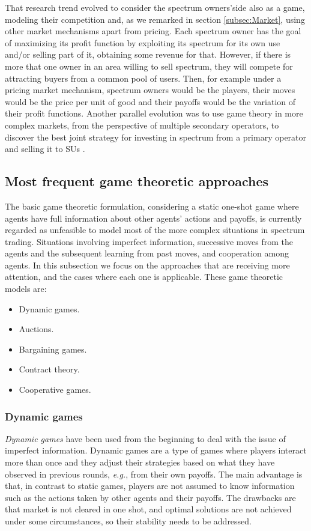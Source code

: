 That research trend evolved to consider the spectrum owners'side also as a game, modeling their competition \cite{ref:Xing2007,ref:Maille2009,ref:Shen2013} and, as we remarked in section \ref{subsec:Market}, using other market mechanisms apart from pricing. 
Each spectrum owner has the goal of maximizing its profit function by exploiting its spectrum for its own use and/or selling part of it, obtaining some revenue for that. 
However, if there is more that one owner in an area willing to sell spectrum, they will compete for attracting buyers from a common pool of users. 
Then, for example under a pricing market mechanism, spectrum owners would be the players, their moves would be the price per unit of good and their payoffs would be the variation of their profit functions. 
Another parallel evolution was to use game theory in more complex markets, from the perspective of multiple secondary operators, to discover the best joint strategy for investing in spectrum from a primary operator and selling it to SUs \cite{ref:Jia2008_com,ref:Kim2011,ref:Zhu2012_Dyn}. 

\subsection{Most frequent game theoretic approaches}
The basic game theoretic formulation, considering a static one-shot game where agents have full information about other agents' actions and payoffs, is currently regarded as unfeasible to model most of the more complex situations in spectrum trading. Situations involving imperfect information, successive moves from the agents and the subsequent learning from past moves, and cooperation among agents.
In this subsection we focus on the approaches that are receiving more attention, and the cases where each one is applicable. These game theoretic models are:
\begin{itemize}
	\item Dynamic games.
	\item Auctions.
	\item Bargaining games.
	\item Contract theory.
	\item Cooperative games.
\end{itemize}

\subsubsection{Dynamic games}
\textit{Dynamic games} have been used from the beginning to deal with the issue of imperfect information. 
Dynamic games are a type of games where players interact more than once and they adjust their strategies based on what they have observed in previous rounds, \textit{e.g.}, from their own payoffs. 
The main advantage is that, in contrast to static games, players are not assumed to know information such as the actions taken by other agents and their payoffs. 
The drawbacks are that market is not cleared in one shot, and optimal solutions are not achieved under some circumstances, so their stability needs to be addressed. 

